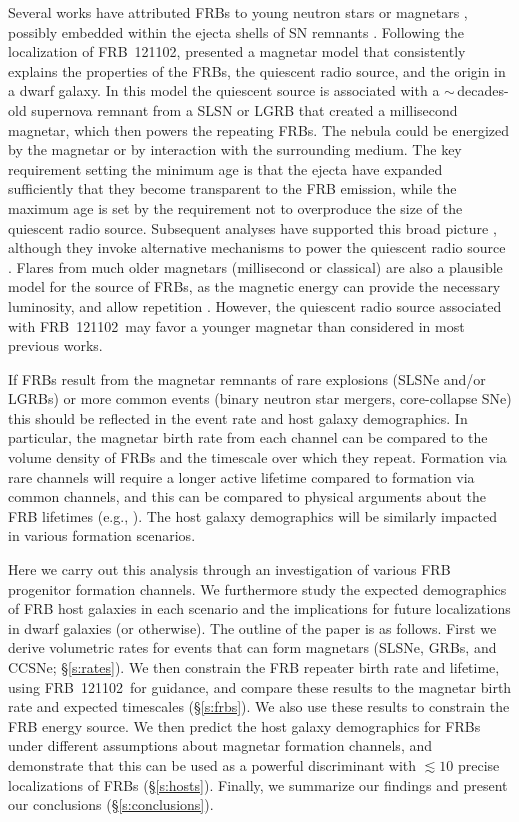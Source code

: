 \documentclass[twocolumn]{aastex6}
\newcommand{\repeater}{FRB~121102}
\begin{document}
Several works have attributed FRBs to young neutron stars or magnetars \citep{Kulkarni+15, Katz16, Cordes&Wasserman16, Lyutikov+16, Popov&Pshirkov16, Yang+16, Kumar+17}, possibly embedded within the ejecta shells of SN remnants \citep{Connor+16, Piro16, Murase+16,wax2017}. Following the localization of \repeater, \citet{mbm.2017} presented a magnetar model that consistently explains the properties of the FRBs,  the quiescent radio source, and the origin in a dwarf galaxy.  In this model the quiescent source is associated with a $\sim$\,decades-old supernova remnant from a SLSN or LGRB that created a millisecond magnetar, which then powers the repeating FRBs. The nebula could be energized by the magnetar or by interaction with the surrounding medium.  The key requirement setting the minimum age is that the ejecta have expanded sufficiently that they become transparent to the FRB emission, while the maximum age is set by the requirement not to overproduce the size of the quiescent radio source. Subsequent analyses have supported this broad picture \citep[e.g.][]{bel2017,lyu2017,piro2017}, although they invoke alternative mechanisms to power the quiescent radio source \citep{bel2017}. Flares from much older magnetars (millisecond or classical) are also a plausible model for the source of FRBs, as the magnetic energy can provide the necessary luminosity, and allow repetition \citep[e.g.][]{pop2013,lyu2014,pen2015,bel2017}. However, the quiescent radio source associated with \repeater\ may favor a younger magnetar than considered in most previous works.

If FRBs result from the magnetar remnants of rare explosions (SLSNe and/or LGRBs) or more common events (binary neutron star mergers, core-collapse SNe) this should be reflected in the event rate and host galaxy demographics.  In particular, the magnetar birth rate from each channel can be compared to the volume density of FRBs and the timescale over which they repeat.  Formation via rare channels will require a longer active lifetime compared to formation via common channels, and this can be compared to physical arguments about the FRB lifetimes (e.g., \citealt{mbm.2017}).  The host galaxy demographics will be similarly impacted in various formation scenarios.  

Here we carry out this analysis through an investigation of various FRB progenitor formation channels.  We furthermore study the expected demographics of FRB host galaxies in each scenario and the implications for future localizations in dwarf galaxies (or otherwise).  The outline of the paper is as follows. First we derive volumetric rates for events that can form magnetars (SLSNe, GRBs, and CCSNe; \S\ref{s:rates}). We then constrain the FRB repeater birth rate and lifetime, using \repeater\ for guidance, and compare these results to the magnetar birth rate and expected timescales (\S\ref{s:frbs}). We also use these results to constrain the FRB energy source. We then predict the host galaxy demographics for FRBs under different assumptions about magnetar formation channels, and demonstrate that this can be used as a powerful discriminant with $\lesssim 10$ precise localizations of FRBs (\S\ref{s:hosts}). Finally, we summarize our findings and present our conclusions (\S\ref{s:conclusions}).
\end{document}
